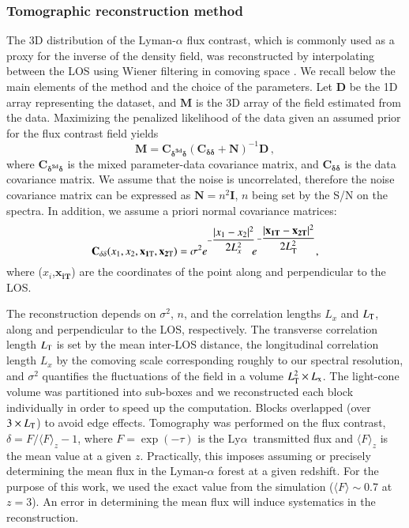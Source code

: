 \documentclass{aa}
\newcommand{\lya}{Ly$\alpha$}
\begin{document}
\subsubsection{Tomographic reconstruction method}
The 3D distribution of the Lyman-$\alpha$ flux contrast, which is commonly used as a proxy for the inverse of the density field, was reconstructed by interpolating between the LOS using Wiener filtering in comoving space \citep[see][]{Pichon2001,Caucci2008,Lee2018}. 
We recall below the main elements of the method and the choice of the parameters. 
Let     $\mathbf{D}$ be the 1D array representing the dataset, and $\mathbf{M}$ is the 3D array  of the field estimated from the data.  Maximizing the penalized likelihood of the data given an assumed prior for the flux contrast field yields
        \begin{equation}
        \textbf{M} = \mathbf{C_{\delta^{3d} \delta }} (\mathbf{C_{\delta \delta}} +\mathbf{N})^{-1} \mathbf{D}\,,
        \end{equation}
where $\mathbf{C_{\delta^{3d} \delta}}$ is the mixed parameter-data covariance matrix, and $\mathbf{C_{\delta \delta}}$ is the data covariance matrix. We assume that the noise is uncorrelated, therefore the noise covariance matrix can be expressed as $\mathbf{N}=n^{2}\mathbf{I}$, $n$ being set by the S/N on the spectra. In addition, we assume a priori normal covariance matrices:
\begin{equation}
\mathbf{C_{\delta \delta}}(x_{1},x_{2},\mathbf{x_{1\rm T}},\mathbf{x_{2\rm T}})={\sigma^{2}}e^{-\dfrac{\vert x_{1}-x_{2} \vert ^{2}}{2 L_{x}^2}}\!\!e^{-\dfrac{\vert \mathbf{x_{1 T}}-\mathbf{x_{2 T}} \vert^{2}}{2 L_{\rm T}^{2}}}
,\end{equation}
where ($x_{i}$,$\mathbf{x_{iT}}$) are the coordinates of the point along and perpendicular to the LOS.

The reconstruction depends on $\sigma^{2}$, $n$, and the correlation lengths  $L_{x}$  and $L_{\rm T}$, along and perpendicular to the LOS, respectively. The transverse correlation length $L_{\rm T}$ is set by the mean inter-LOS distance, the longitudinal correlation length $L_{x}$ by the comoving scale corresponding roughly to our spectral resolution, and $\sigma^{2}$ quantifies the fluctuations of the field in a volume $L_{\rm T}^{2}\times L_{\rm x}$. The light-cone volume was partitioned into sub-boxes and we reconstructed each block individually in order to speed up the computation. Blocks overlapped (over $3 \times L_{\rm T}$) to avoid edge effects. 
Tomography was performed on the flux  contrast, $\delta = F/\langle F\rangle_{z} - 1$, where $F = \exp\left(-\tau\right)$ is the \lya\, transmitted flux and $\langle F\rangle_{z}$ is the mean value at a given $z$. Practically, this imposes assuming or precisely determining the mean flux in the Lyman-$\alpha$ forest at a given redshift. For the purpose of this work, we used the exact value from the simulation ($\langle F \rangle \sim$0.7 at $z=3$). An error in determining the mean flux will induce systematics in the reconstruction.
\end{document}
